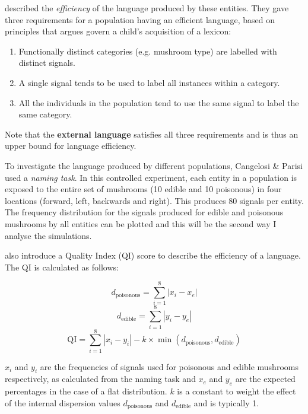 \documentclass[12pt,a4paper]{report}
\begin{document}
\cite{Cangelosi1998} described the \emph{efficiency} of the language produced by these entities. They gave three requirements for a population having an efficient language, based on principles that \cite{Clark1995} argues govern a child's acquisition of a lexicon:

\begin{enumerate}
	\item Functionally distinct categories (e.g. mushroom type) are labelled with distinct signals.
	\item A single signal tends to be used to label all instances within a category.
	\item All the individuals in the population tend to use the same signal to label the same category.
\end{enumerate}

Note that the {\bf external language} satisfies all three requirements and is thus an upper bound for language efficiency.

To investigate the language produced by different populations, Cangelosi \& Parisi used a \emph{naming task}. In this controlled experiment, each entity in a population is exposed to the entire set of mushrooms (10 edible and 10 poisonous) in four locations (forward, left, backwards and right). This produces 80 signals per entity. The frequency distribution for the signals produced for edible and poisonous mushrooms by all entities can be plotted and this will be the second way I analyse the simulations.

\citet{Cangelosi1998} also introduce a Quality Index (QI) score to describe the efficiency of a language. The QI is calculated as follows:

\begin{equation}
\label{equation:dpoisonous}
d_{\mathrm{poisonous}} = \sum^{8}_{i = 1}{|x_i - x_e|}
\end{equation}
\begin{equation}
\label{equation:dedible}
d_{\mathrm{edible}} = \sum^{8}_{i = 1}{|y_i - y_e|}
\end{equation}
\begin{equation}
\label{equation:qi}
\mathrm{QI} = \sum^{8}_{i = 1} |x_i - y_i| - k \times \min (d_{\mathrm{poisonous}}, d_{\mathrm{edible}})
\end{equation}

$x_i$ and $y_i$ are the frequencies of signals used for poisonous and edible mushrooms respectively, as calculated from the naming task and $x_e$ and $y_e$ are the expected percentages in the case of a flat distribution. $k$ is a constant to weight the effect of the internal dispersion values $d_{\mathrm{poisonous}}$ and $d_{\mathrm{edible}}$ and is typically 1.
\end{document}
